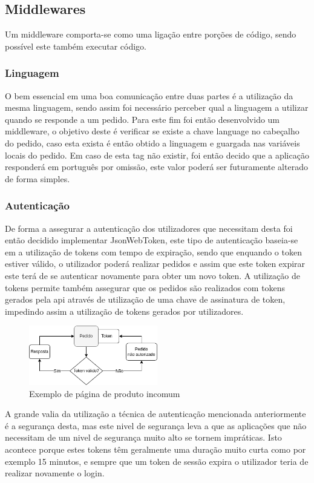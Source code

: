 \subsection{Middlewares} 
Um middleware comporta-se como uma ligação entre porções de código, sendo possível este também executar código.

\subsubsection{Linguagem}
O bem essencial em uma boa comunicação entre duas partes é a utilização da mesma linguagem, sendo assim foi necessário perceber qual a linguagem a utilizar quando se responde a um pedido. Para este fim foi então desenvolvido um middleware, o objetivo deste é verificar se existe a chave language no cabeçalho do pedido, caso esta exista é então obtido a linguagem e guargada nas variáveis locais do pedido. Em caso de esta tag não existir, foi então decido que a aplicação responderá em português por omissão, este valor poderá ser futuramente alterado de forma simples.

\subsubsection{Autenticação}
De forma a assegurar a autenticação dos utilizadores que necessitam desta foi então decidido implementar JsonWebToken, este tipo de autenticação baseia-se em a utilização de tokens com tempo de expiração, sendo que enquando o token estiver válido, o utilizador poderá realizar pedidos e assim que este token expirar este terá de se autenticar novamente para obter um novo token.
A utilização de tokens permite também assegurar que os pedidos são realizados com tokens gerados pela api através de utilização de uma chave de assinatura de token, impedindo assim a utilização de tokens gerados por utilizadores.
\begin{figure}[htb]
  \centering
  \includegraphics[width=0.5\textwidth]{images/implementacao/api/jwt_session.png}
  \caption{Exemplo de página de produto incomum}
  \label{fig:64}
\end{figure}

A grande valia da utilização a técnica de autenticação mencionada anteriormente é a segurança desta, mas este nivel de segurança leva a que as aplicações que não necessitam de um nivel de segurança muito alto se tornem impráticas. Isto acontece porque estes  tokens têm geralmente uma duração muito curta como por exemplo 15 minutos, e sempre que um token de sessão expira o utilizador 
teria de realizar novamente o login.

